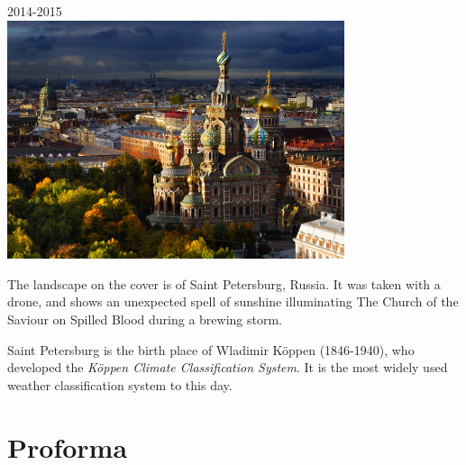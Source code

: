\documentclass[a4paper,12pt,twoside]{report}
\begin{document}
\begin{titlepage}

{\large 2014-2015}\\[3cm] %


\includegraphics[height=7cm]{stp.jpg}\\
 

\vfill %

\end{titlepage}

The landscape on the cover is of Saint Petersburg, Russia. It was taken with a drone, and shows an unexpected spell of sunshine illuminating The Church of the Saviour on Spilled Blood during a brewing storm.

Saint Petersburg is the birth place of Wladimir K\"{o}ppen (1846-1940), who developed the \textit{K\"{o}ppen Climate Classification System}. It is the most widely used weather classification system to this day.
\vfill

\chapter*{Proforma}
\setcounter{page}{1}
\end{document}
